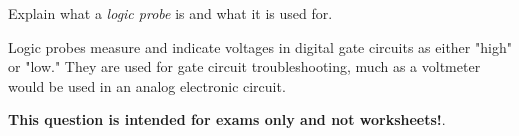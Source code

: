 

Explain what a {\it logic probe} is and what it is used for.







Logic probes measure and indicate voltages in digital gate circuits as either "high" or "low."  They are used for gate circuit troubleshooting, much as a voltmeter would be used in an analog electronic circuit.







{\bf This question is intended for exams only and not worksheets!}.




